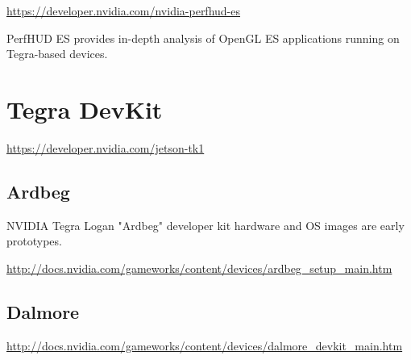 \url{https://developer.nvidia.com/nvidia-perfhud-es}

PerfHUD ES provides in-depth analysis of OpenGL ES applications running on
Tegra-based devices. 


\section{Tegra DevKit}
\label{sec:Tegra_Devkit}

\url{https://developer.nvidia.com/jetson-tk1}

\subsection{Ardbeg}
\label{sec:Tegra_Ardbeg_Devkit}

NVIDIA Tegra Logan "Ardbeg" developer kit hardware and OS images are early
prototypes.

\url{http://docs.nvidia.com/gameworks/content/devices/ardbeg_setup_main.htm}



\subsection{Dalmore}

\url{http://docs.nvidia.com/gameworks/content/devices/dalmore_devkit_main.htm}